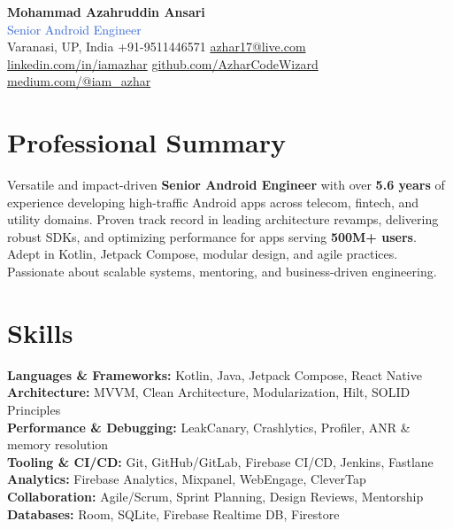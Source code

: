 \documentclass[a4paper,10pt]{article}
\begin{document}
\begin{center}
    {\Huge \textbf{Mohammad Azahruddin Ansari}} \\
    \vspace{4pt}
    {\large \textcolor{highlight}{Senior Android Engineer}} \\
    \vspace{6pt}
    \small
    \faMapMarker \hspace{1mm} Varanasi, UP, India \quad
    \faPhone \hspace{1mm} +91-9511446571 \quad
    \faEnvelope \hspace{1mm} \href{mailto:azhar17@live.com}{azhar17@live.com} \\
    \faLinkedin \hspace{1mm} \href{https://www.linkedin.com/in/iamazhar/}{linkedin.com/in/iamazhar} \quad
    \faGithub \hspace{1mm} \href{https://github.com/AzharCodeWizard}{github.com/AzharCodeWizard} \quad
    \faMedium \hspace{1mm} \href{https://medium.com/@iam_azhar}{medium.com/@iam\_azhar}
\end{center}

\vspace{8pt}

\section*{Professional Summary}
Versatile and impact-driven \textbf{Senior Android Engineer} with over \textbf{5.6 years} of experience developing high-traffic Android apps across telecom, fintech, and utility domains. Proven track record in leading architecture revamps, delivering robust SDKs, and optimizing performance for apps serving \textbf{500M+ users}. Adept in Kotlin, Jetpack Compose, modular design, and agile practices. Passionate about scalable systems, mentoring, and business-driven engineering.

\section*{Skills}
\textbf{Languages \& Frameworks:} Kotlin, Java, Jetpack Compose, React Native \\
\textbf{Architecture:} MVVM, Clean Architecture, Modularization, Hilt, SOLID Principles \\
\textbf{Performance \& Debugging:} LeakCanary, Crashlytics, Profiler, ANR \& memory resolution \\
\textbf{Tooling \& CI/CD:} Git, GitHub/GitLab, Firebase CI/CD, Jenkins, Fastlane \\
\textbf{Analytics:} Firebase Analytics, Mixpanel, WebEngage, CleverTap \\
\textbf{Collaboration:} Agile/Scrum, Sprint Planning, Design Reviews, Mentorship \\
\textbf{Databases:} Room, SQLite, Firebase Realtime DB, Firestore
\end{document}
